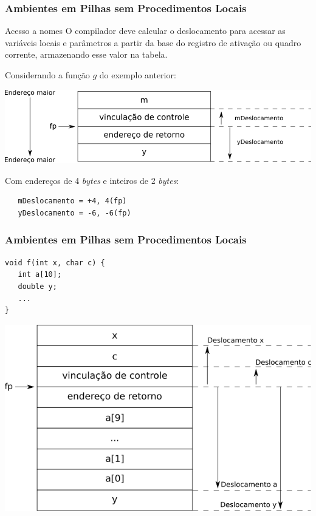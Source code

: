 \documentclass[table]{beamer}
\begin{document}
\begin{frame}[fragile]
   \frametitle{Ambientes em Pilhas sem Procedimentos Locais}
   \begin{block}{Acesso a nomes}
   O compilador deve calcular o deslocamento para acessar as variáveis locais e parâmetros a partir da base do registro de ativação ou quadro corrente, armazenando esse valor na tabela.
   \end{block}
   Considerando a função $g$ do exemplo anterior:
   \begin{center}
   \includegraphics[scale=0.4]{figuras/ambientebaseadoempilhas04.png}
   \end{center}
   Com endereços de 4 \textit{bytes} e inteiros de 2 \textit{bytes}:
   \begin{verbatim}
   mDeslocamento = +4, 4(fp)
   yDeslocamento = -6, -6(fp)
   \end{verbatim}
\end{frame}

\begin{frame}[fragile]
   \frametitle{Ambientes em Pilhas sem Procedimentos Locais}
   \begin{verbatim}
void f(int x, char c) {
   int a[10];
   double y;
   ...
}
   \end{verbatim}
   \begin{center}
   \includegraphics[scale=0.4]{figuras/ambientebaseadoempilhas05.png}
   \end{center}
\end{frame}
\end{document}

